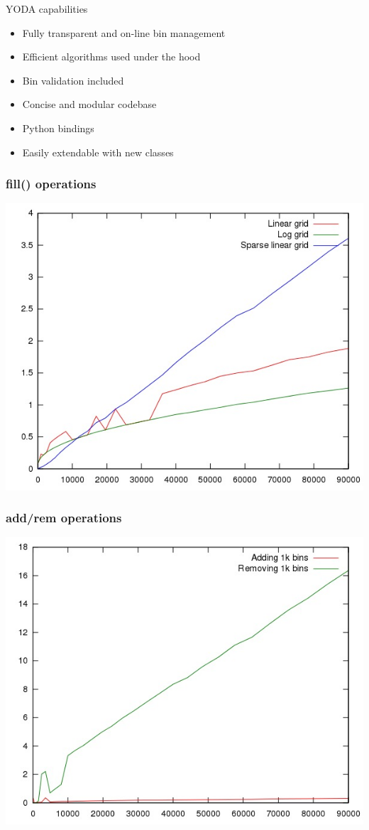 \documentclass{beamer}
\begin{document}
  \begin{frame}{YODA capabilities}
    \begin{itemize}[<uncover@+>]
      \item Fully transparent and on-line bin management
      \item Efficient algorithms used under the hood
      \item Bin validation included
      \item Concise and modular codebase
      \item Python bindings 
      \item Easily extendable with new classes
    \end{itemize}
  \end{frame}
  \begin{frame}
      \frametitle{fill() operations}
      \includegraphics[height=0.89\textheight]{1.jpg}
  \end{frame}
  \begin{frame}
    \frametitle{add/rem operations}
    \includegraphics[height=0.89\textheight]{2.jpg}
  \end{frame}
\end{document}
